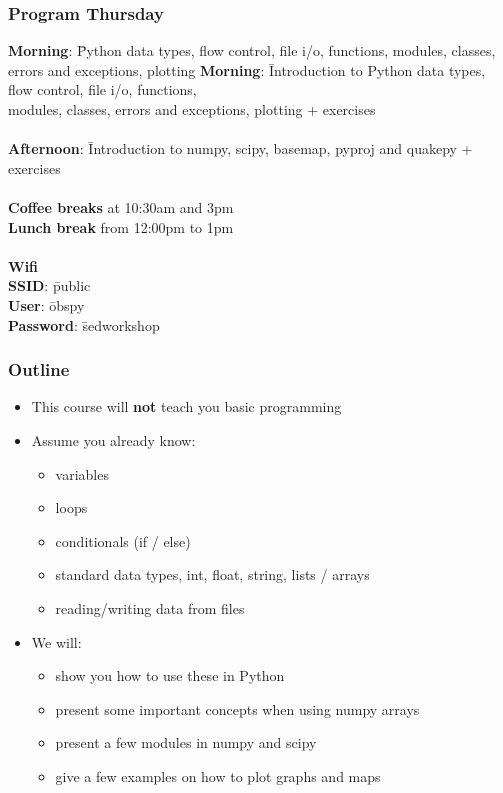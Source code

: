 \begin{frame}[fragile]
\frametitle{Program Thursday}
\begin{tabbing}
\textbf{Morning}: \= Python data types, flow control, file i/o, functions,
modules, classes, errors and exceptions, plotting \kill
\textbf{Morning}: \= Introduction to Python data types, flow control, file i/o,
functions,\\
 modules, classes, errors and exceptions, plotting + exercises \\
\\
\textbf{Afternoon}: \= Introduction to numpy, scipy, basemap, pyproj and quakepy
+ exercises
\\
\\ 
\textbf{Coffee breaks} at 10:30am and 3pm\\
\textbf{Lunch break} from 12:00pm to 1pm\\
\\
\textbf{Wifi}\\
\textbf{SSID}: \= public\\
\textbf{User}: \= obspy\\
\textbf{Password}: \= sedworkshop\\

\end{tabbing}
\end{frame}

\begin{frame}[fragile]
    \frametitle{Outline}
    \begin{itemize}
        \item This course will \textbf{not} teach you basic programming
        \item Assume you already know:
        \begin{itemize}
            \item variables
            \item loops
            \item conditionals (if / else)
            \item standard data types, int, float, string, lists / arrays
            \item reading/writing data from files
        \end{itemize}
        \item We will:
        	\begin{itemize}
        	  \item show you how to use these in Python 
		      \item present some important concepts when using numpy arrays
		      \item present a few modules in numpy and scipy
		      \item give a few examples on how to plot graphs and maps
        	\end{itemize} 
    \end{itemize}
\end{frame}

